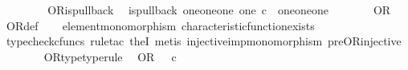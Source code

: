 \begin{isabellebody}
\ \ \ \ \isamarkupfalse%
\isanewline
\ \ \isamarkupfalse%
\isanewline
{}\isamarkupfalse%
%
\endisatagproof
{\isafoldproof}%
%
\isadelimproof
\isanewline
%
\endisadelimproof
\isanewline
{}\isamarkupfalse%
\ OR{\isacharunderscore}{\kern0pt}is{\isacharunderscore}{\kern0pt}pullback{\isacharcolon}{\kern0pt}\isanewline
\ \ {\isachardoublequoteopen}is{\isacharunderscore}{\kern0pt}pullback\ {\isacharparenleft}{\kern0pt}one{\isasymCoprod}{\isacharparenleft}{\kern0pt}one{\isasymCoprod}one{\isacharparenright}{\kern0pt}{\isacharparenright}{\kern0pt}\ one\ {\isacharparenleft}{\kern0pt}{\isasymOmega}{\isasymtimes}\isactrlsub c{\isasymOmega}{\isacharparenright}{\kern0pt}\ {\isasymOmega}\ {\isacharparenleft}{\kern0pt}{\isasymbeta}\isactrlbsub {\isacharparenleft}{\kern0pt}one{\isasymCoprod}{\isacharparenleft}{\kern0pt}one{\isasymCoprod}one{\isacharparenright}{\kern0pt}{\isacharparenright}{\kern0pt}\isactrlesub {\isacharparenright}{\kern0pt}\ {\isasymt}\ {\isacharparenleft}{\kern0pt}{\isasymlangle}{\isasymt}{\isacharcomma}{\kern0pt}\ {\isasymt}{\isasymrangle}{\isasymamalg}\ {\isacharparenleft}{\kern0pt}{\isasymlangle}{\isasymt}{\isacharcomma}{\kern0pt}\ {\isasymf}{\isasymrangle}\ {\isasymamalg}{\isasymlangle}{\isasymf}{\isacharcomma}{\kern0pt}\ {\isasymt}{\isasymrangle}{\isacharparenright}{\kern0pt}{\isacharparenright}{\kern0pt}\ OR{\isachardoublequoteclose}\isanewline
%
\isadelimproof
\ \ %
\endisadelimproof
%
\isatagproof
{}\isamarkupfalse%
\ OR{\isacharunderscore}{\kern0pt}def\isanewline
\ \ \isamarkupfalse%
\ element{\isacharunderscore}{\kern0pt}monomorphism\ characteristic{\isacharunderscore}{\kern0pt}function{\isacharunderscore}{\kern0pt}exists\isanewline
\ \ \isamarkupfalse%
\ {\isacharparenleft}{\kern0pt}typecheck{\isacharunderscore}{\kern0pt}cfuncs{\isacharcomma}{\kern0pt}\ rule{\isacharunderscore}{\kern0pt}tac\ the{}I{}{\isacharcomma}{\kern0pt}\ metis\ injective{\isacharunderscore}{\kern0pt}imp{\isacharunderscore}{\kern0pt}monomorphism\ pre{\isacharunderscore}{\kern0pt}OR{\isacharunderscore}{\kern0pt}injective{\isacharparenright}{\kern0pt}%
\endisatagproof
{\isafoldproof}%
%
\isadelimproof
\isanewline
%
\endisadelimproof
\ \ \ \ \ \ \isanewline
{}\isamarkupfalse%
\ OR{\isacharunderscore}{\kern0pt}type{\isacharbrackleft}{\kern0pt}type{\isacharunderscore}{\kern0pt}rule{\isacharbrackright}{\kern0pt}{\isacharcolon}{\kern0pt}\isanewline
\ \ {\isachardoublequoteopen}OR\ {\isacharcolon}{\kern0pt}\ {\isasymOmega}\ {\isasymtimes}\isactrlsub c\ {\isasymOmega}\ {\isasymrightarrow}\ {\isasymOmega}{\isachardoublequoteclose}\isanewline

\end{isabellebody}
